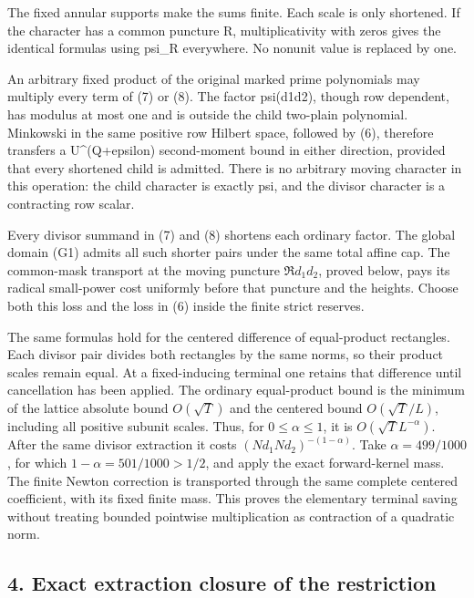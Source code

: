 The fixed annular supports make the sums finite. Each scale is only shortened. If the character has a common puncture R, multiplicativity with zeros gives the identical formulas using psi\_\allowbreak{}R everywhere. No nonunit value is replaced by one.

An arbitrary fixed product of the original marked prime polynomials may multiply every term of (7) or (8). The factor psi(d1d2), though row dependent, has modulus at most one and is outside the child two-plain polynomial. Minkowski in the same positive row Hilbert space, followed by (6), therefore transfers a U\^{}(Q+epsilon) second-moment bound in either direction, provided that every shortened child is admitted. There is no arbitrary moving character in this operation: the child character is exactly psi, and the divisor character is a contracting row scalar.

Every divisor summand in (7) and (8) shortens each ordinary factor. The global domain (G1) admits all such shorter pairs under the same total affine cap. The common-mask transport at the moving puncture \(\mathfrak R d_1d_2\), proved below, pays its radical small-power cost uniformly before that puncture and the heights. Choose both this loss and the loss in (6) inside the finite strict reserves.

The same formulas hold for the centered difference of equal-product rectangles. Each divisor pair divides both rectangles by the same norms, so their product scales remain equal. At a fixed-inducing terminal one retains that difference until cancellation has been applied. The ordinary equal-product bound is the minimum of the lattice absolute bound \(O(\sqrt T)\) and the centered bound \(O(\sqrt T/L)\), including all positive subunit scales. Thus, for \(0\le\alpha\le1\), it is \(O(\sqrt T L^{-\alpha})\). After the same divisor extraction it costs \((Nd_1Nd_2)^{-(1-\alpha)}\). Take \(\alpha=499/1000\), for which \(1-\alpha=501/1000>1/2\), and apply the exact forward-kernel mass. The finite Newton correction is transported through the same complete centered coefficient, with its fixed finite mass. This proves the elementary terminal saving without treating bounded pointwise multiplication as contraction of a quadratic norm.

\hypertarget{sources:exact-extraction-closure-of-the-restriction}{%
\subsection{4. Exact extraction closure of the restriction}\label{sources:exact-extraction-closure-of-the-restriction}}

